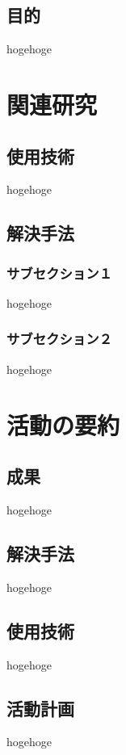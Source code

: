 \documentclass[12pt,a4paper]{report}
\begin{document}
\section{目的}
\noindent
hogehoge

\chapter{関連研究}
\section{使用技術}
\noindent
hogehoge
\section{解決手法}
\subsection{サブセクション１}
\noindent
hogehoge
\subsection{サブセクション２}
\noindent
hogehoge

\chapter{活動の要約}
\section{成果}
\noindent
hogehoge
\section{解決手法}
\noindent
hogehoge
\section{使用技術}
\noindent
hogehoge
\section{活動計画}
\noindent
hogehoge
\end{document}
